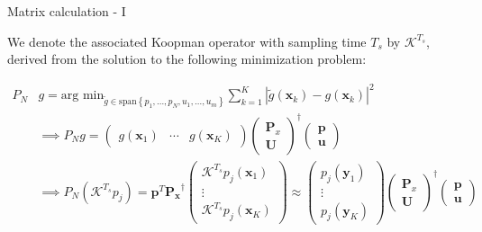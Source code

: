 \documentclass{beamer}
\begin{document}
\begin{frame}{Matrix calculation - I}

    We denote the associated Koopman operator with sampling time $T_s$ by $\mathcal{K}^{T_s}$, derived from the solution to the following minimization problem:

    \begin{align}
        P_N & g = \text{arg min}_{\tilde{g} \in \text{span}\left\{p_1 , \dots , p_N , u_1 , \dots , u_m\right\}} \sum_{k=1}^K \left|\tilde{g}\left(\mathbf{x}_k\right) - g\left(\mathbf{x}_k\right)\right|^2 \\
        &\implies P_N g =
        \begin{pmatrix}
            g\left(\mathbf{x}_1\right) &
            \cdots &
            g\left(\mathbf{x}_K\right)
        \end{pmatrix}
        \begin{pmatrix}
            \mathbf{P}_x \\
            \mathbf{U}
        \end{pmatrix}^\dagger
        \begin{pmatrix}
            \mathbf{p} \\
            \mathbf{u}
        \end{pmatrix}\\
        & \implies P_N \left(\mathcal{K}^{T_s} p_j\right) = \mathbf{p}^T \mathbf{P_x}^\dagger
        \begin{pmatrix}
            \mathcal{K}^{T_s} p_j\left(\mathbf{x}_1\right) \\
            \vdots \\
            \mathcal{K}^{T_s} p_j\left(\mathbf{x}_K\right)
        \end{pmatrix}
        \approx
        \begin{pmatrix}
            p_j\left(\mathbf{y}_1\right) \\
            \vdots \\
            p_j\left(\mathbf{y}_K\right)
        \end{pmatrix}
        \begin{pmatrix}
            \mathbf{P}_x \\
            \mathbf{U}
        \end{pmatrix}^\dagger
        \begin{pmatrix}
            \mathbf{p} \\
            \mathbf{u}
        \end{pmatrix}
    \end{align}
\end{frame}
\end{document}
